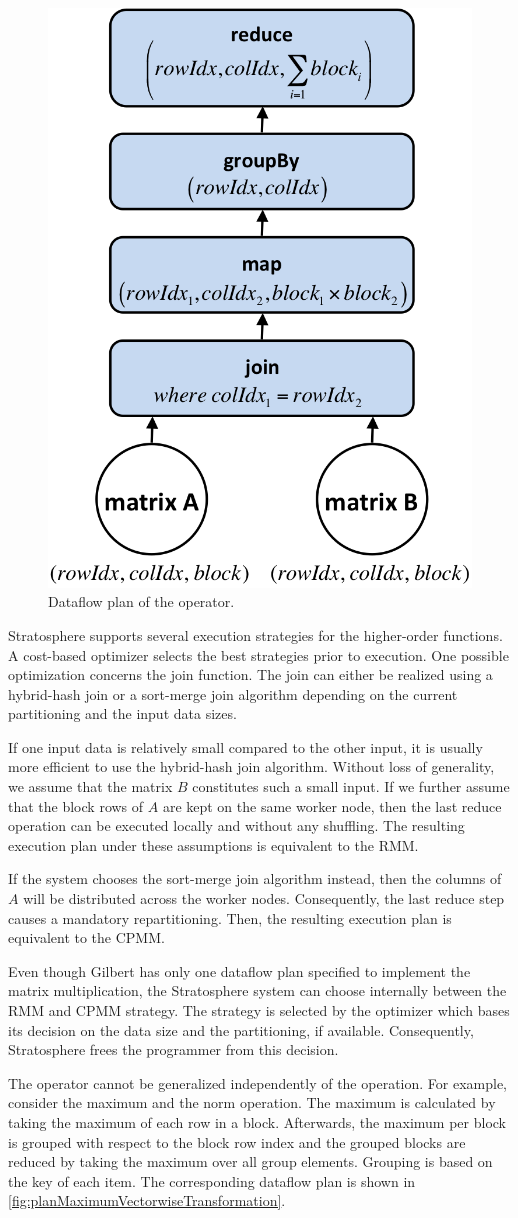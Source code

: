 \begin{figure}[!h]
	\centering
	\includegraphics[width=0.354\linewidth]{images/planMatrixMultiplication.png}
	\caption{Dataflow plan of the  operator.}
	\label{fig:planMatrixMultiplication}
\end{figure}

Stratosphere supports several execution strategies for the higher-order functions.
A cost-based optimizer selects the best strategies prior to execution.
One possible optimization concerns the join function.
The join can either be realized using a hybrid-hash join or a sort-merge join algorithm depending on the current partitioning and the input data sizes.

If one input data is relatively small compared to the other input, it is usually more efficient to use the hybrid-hash join algorithm.
Without loss of generality, we assume that the matrix $B$ constitutes such a small input.
If we further assume that the block rows of $A$ are kept on the same worker node, then the last reduce operation can be executed locally and without any shuffling.
The resulting execution plan under these assumptions is equivalent to the RMM.

If the system chooses the sort-merge join algorithm instead, then the columns of $A$ will be distributed across the worker nodes.
Consequently, the last reduce step causes a mandatory repartitioning.
Then, the resulting execution plan is equivalent to the CPMM.

Even though Gilbert has only one dataflow plan specified to implement the matrix multiplication, the Stratosphere system can choose internally between the RMM and CPMM strategy.
The strategy is selected by the optimizer which bases its decision on the data size and the partitioning, if available.
Consequently, Stratosphere frees the programmer from this decision.

The  operator cannot be generalized independently of the  operation.
For example, consider the maximum and the norm operation.
The maximum is calculated by taking the maximum of each row in a block.
Afterwards, the maximum per block is grouped with respect to the block row index and the grouped blocks are reduced by taking the maximum over all group elements.
Grouping is based on the key of each item.
The corresponding dataflow plan is shown in \cref{fig:planMaximumVectorwiseTransformation}.

